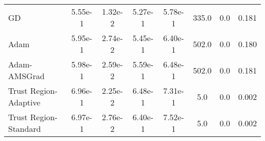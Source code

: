 \documentclass{article}
\begin{document}
\begin{table}[htbp]
{\begin{tabular}{l*{7}{S[table-format=2.2e-1]}}
GD & 5.55e-1 & 1.32e-2 & 5.27e-1 & 5.78e-1 & 335.0 & 0.0 & 0.181 \\
Adam & 5.95e-1 & 2.74e-2 & 5.45e-1 & 6.40e-1 & 502.0 & 0.0 & 0.180 \\
Adam-AMSGrad & 5.98e-1 & 2.59e-2 & 5.59e-1 & 6.48e-1 & 502.0 & 0.0 & 0.181 \\
Trust Region-Adaptive & 6.96e-1 & 2.25e-2 & 6.48e-1 & 7.31e-1 & 5.0 & 0.0 & 0.002 \\
Trust Region-Standard & 6.97e-1 & 2.76e-2 & 6.40e-1 & 7.52e-1 & 5.0 & 0.0 & 0.002 \\
\bottomrule
\end{tabular}
}
\end{table}
\end{document}
